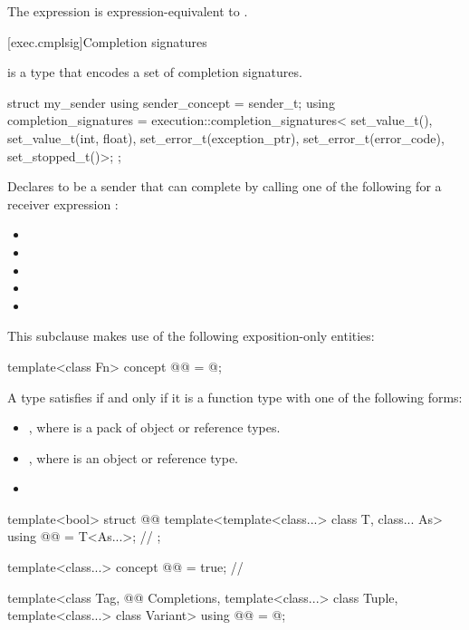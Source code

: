 \pnum
The expression  is expression-equivalent to
.

[exec.cmplsig]{Completion signatures}

\pnum
{} is a type
that encodes a set of completion signatures.

\pnum
\begin{example}
\begin{codeblock}
struct my_sender {
  using sender_concept = sender_t;
  using completion_signatures =
    execution::completion_signatures<
      set_value_t(),
      set_value_t(int, float),
      set_error_t(exception_ptr),
      set_error_t(error_code),
      set_stopped_t()>;
};
\end{codeblock}
Declares  to be a sender
that can complete by calling one of the following
for a receiver expression :
\begin{itemize}
\item {}
\item {}
\item {}
\item {}
\item {}
\end{itemize}
\end{example}

\pnum
This subclause makes use of the following exposition-only entities:
\begin{codeblock}
template<class Fn>
  concept @@ = @\seebelow@;
\end{codeblock}

\pnum
A type  satisfies 
if and only if it is a function type with one of the following forms:
\begin{itemize}
\item
{},
where  is a pack of object or reference types.
\item
{},
where  is an object or reference type.
\item
{}
\end{itemize}

\pnum
\begin{codeblock}
template<bool>
  struct @@ {
    template<template<class...> class T, class... As>
      using @@ = T<As...>;                              // \expos
  };

template<class...>
  concept @@ = true;                                   // \expos

template<class Tag,
         @@ Completions,
         template<class...> class Tuple,
         template<class...> class Variant>
  using @@ = @\seebelow@;
\end{codeblock}

